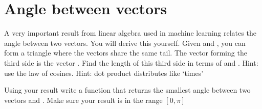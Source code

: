 \documentclass[letterpaper,10pt,english]{jupyterBook}
\begin{document}
\section{Angle between vectors}
\label{\detokenize{lessons/Matrices-student:angle-between-vectors}}
\sphinxAtStartPar
A very important result from linear algebra used in machine learning relates the angle between two vectors. You will derive this yourself. Given  and , you can form a triangle where the vectors share the same tail. The vector forming the third side is the vector . Find the length of this third side in terms of  and . Hint: use the law of cosines. Hint: dot product distributes like ‘times’

\sphinxAtStartPar
Using your result write a function  that returns the smallest angle between two vectors  and . Make sure your result is in the range \([0,\pi]\)
\end{document}

